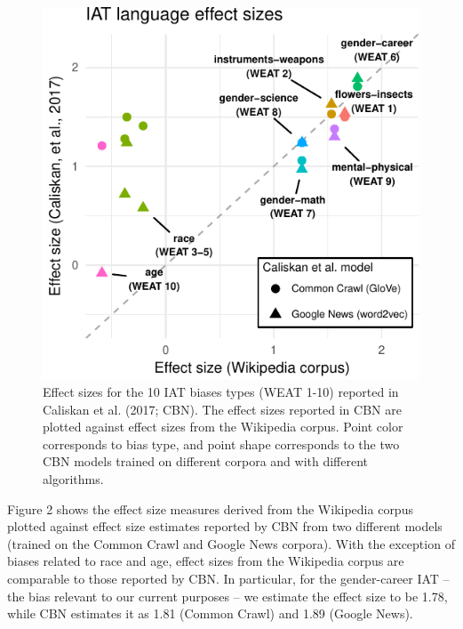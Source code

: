 \documentclass[10pt, letterpaper]{article}
\newenvironment{CodeChunk}{}{}
\begin{document}
\begin{CodeChunk}
\begin{figure}[t]

{\centering \includegraphics{figs/WEAT_plot-1} 

}

\caption[Effect sizes for the 10 IAT biases types (WEAT 1-10) reported in Caliskan et al]{Effect sizes for the 10 IAT biases types (WEAT 1-10) reported in Caliskan et al. (2017; CBN). The effect sizes reported in CBN are plotted against  effect sizes from the Wikipedia corpus.  Point color corresponds to  bias type, and point shape corresponds to the two CBN models trained on different corpora and with different algorithms.}\label{fig:WEAT_plot}
\end{figure}
\end{CodeChunk}

Figure 2 shows the effect size measures derived from the Wikipedia
corpus plotted against effect size estimates reported by CBN from two
different models (trained on the Common Crawl and Google News corpora).
With the exception of biases related to race and age, effect sizes from
the Wikipedia corpus are comparable to those reported by CBN. In
particular, for the gender-career IAT -- the bias relevant to our
current purposes -- we estimate the effect size to be 1.78, while CBN
estimates it as 1.81 (Common Crawl) and 1.89 (Google News).
\end{document}

